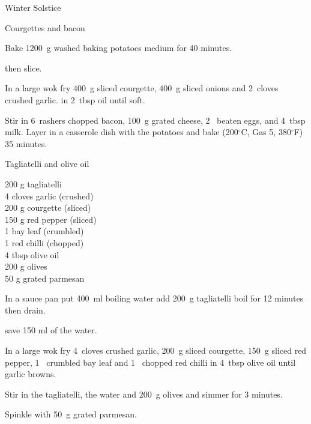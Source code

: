 \begin{menu}{Winter Solstice}
\begin{recipe}{2}{Courgettes and bacon}
\begin{ingredients}
		\end{ingredients}
	
    \begin{instructions}
    \item 
      Bake 1200~g washed baking potatoes
      medium for 40 minutes.
    
        then slice.
      \item 
        In a large wok fry
        400~g sliced courgette,
        400~g sliced onions
        and
        2~cloves crushed garlic.
        in
        2~tbsp  oil
        until soft.
      \item 
        Stir in
        6~rashers chopped bacon,
        100~g grated cheese,
        2~ beaten eggs,
        and
        4~tbsp  milk.
        Layer in a casserole dish
        with the potatoes
        and bake 
      (200$^{\circ}$C, Gas 5, 380$^{\circ}$F)
     35 minutes.
      
    \end{instructions}
    \end{recipe}%
  
    \begin{recipe}{1}{Tagliatelli and olive oil}%
    
		\begin{ingredients}
		200 g tagliatelli  \\
	4 cloves garlic (crushed) \\
	200 g courgette (sliced) \\
	150 g red pepper (sliced) \\
	1  bay leaf (crumbled) \\
	1  red chilli (chopped) \\
	4 tbsp olive oil  \\
	200 g olives  \\
	50 g grated parmesan  \\
	
		\end{ingredients}
	
    \begin{instructions}
    \item 
      In a
      sauce pan
      put
      400~ml  boiling water
      add
      200~g  tagliatelli
      boil for 12 minutes then drain.
    
        save 150 ml of the water.
      \item 
        In a large wok fry
        4~cloves crushed garlic,
        200~g sliced courgette,
        150~g sliced red pepper,
        1~ crumbled bay leaf
        and
        1~ chopped red chilli
        in
        4~tbsp  olive oil
        until garlic browns.
      \item 
        Stir in the tagliatelli,
        the water
        and
        200~g  olives
        and simmer for 3 minutes.
      \item 
        Spinkle with
        50~g  grated parmesan.
      

\end{instructions}
\end{recipe}
\end{menu}
